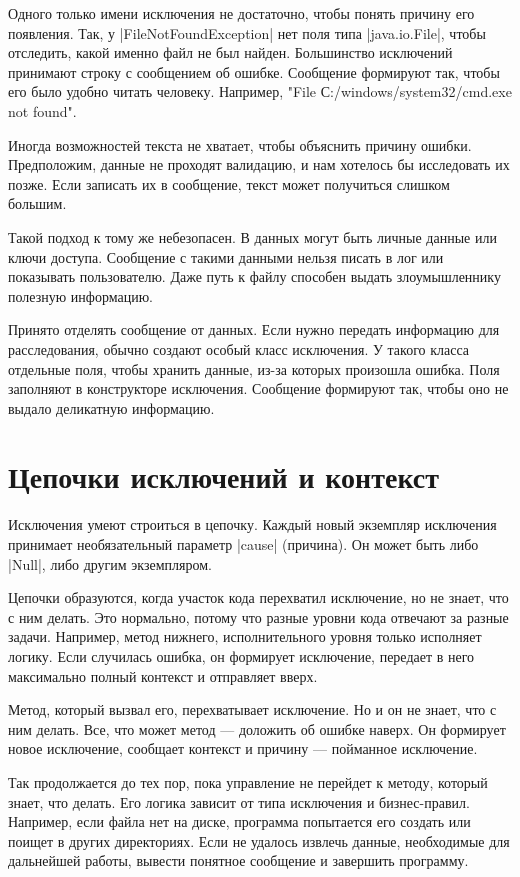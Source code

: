 Одного только имени исключения не достаточно, чтобы понять причину его
появления. Так, у \spverb|FileNotFoundException| нет поля типа \spverb|java.io.File|, чтобы
отследить, какой именно файл не был найден. Большинство исключений принимают
строку с сообщением об ошибке. Сообщение формируют так, чтобы его было удобно
читать человеку. Например, "File С:/windows/system32/cmd.exe not found".

Иногда возможностей текста не хватает, чтобы объяснить причину
ошибки. Предположим, данные не проходят валидацию, и нам хотелось бы исследовать
их позже. Если записать их в сообщение, текст может получиться слишком большим.

Такой подход к тому же небезопасен. В данных могут быть личные данные или ключи
доступа. Сообщение с такими данными нельзя писать в лог или показывать
пользователю. Даже путь к файлу способен выдать злоумышленнику полезную
информацию.

Принято отделять сообщение от данных. Если нужно передать информацию для
расследования, обычно создают особый класс исключения. У такого класса отдельные
поля, чтобы хранить данные, из-за которых произошла ошибка. Поля заполняют в
конструкторе исключения. Сообщение формируют так, чтобы оно не выдало деликатную
информацию.

\section{Цепочки исключений и контекст}

Исключения умеют строиться в цепочку. Каждый новый экземпляр исключения
принимает необязательный параметр \spverb|cause| (причина). Он может быть либо \spverb|Null|,
либо другим экземпляром.

Цепочки образуются, когда участок кода перехватил исключение, но не знает, что с
ним делать. Это нормально, потому что разные уровни кода отвечают за разные
задачи. Например, метод нижнего, исполнительного уровня только исполняет логику.
Если случилась ошибка, он формирует исключение, передает в него максимально
полный контекст и отправляет вверх.

Метод, который вызвал его, перехватывает исключение. Но и он не знает, что с ним
делать. Все, что может метод — доложить об ошибке наверх. Он формирует новое
исключение, сообщает контекст и причину — пойманное исключение.

Так продолжается до тех пор, пока управление не перейдет к методу, который
знает, что делать. Его логика зависит от типа исключения и
бизнес-правил. Например, если файла нет на диске, программа попытается его
создать или поищет в других директориях. Если не удалось извлечь данные,
необходимые для дальнейшей работы, вывести понятное сообщение и завершить
программу.

